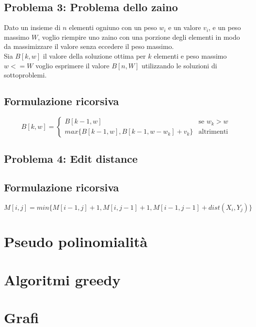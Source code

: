 \documentclass{article}
\begin{document}
\subsection{Problema 3: Problema dello zaino}
Dato un insieme di \(n\) elementi ogniuno con un peso \(w_i\) e un valore \(v_i\), e un peso massimo \(W\), voglio riempire uno zaino con una porzione degli elementi in modo da massimizzare il valore senza eccedere il peso massimo. \\
Sia \(B[k, w]\) il valore della soluzione ottima per \(k\) elementi e peso massimo \(w <= W\) voglio esprimere il valore \(B[n,W]\) utilizzando le soluzioni di sottoproblemi.
\subsection*{Formulazione ricorsiva}
\begin{equation*}
  B[k,w] =
  \begin{cases}
    B[k - 1, w]                         & \text{se } w_k > w \\
    max\{B[k-1,w], B[k-1,w-w_k] + v_k\} & \text{altrimenti}
  \end{cases}
\end{equation*}
\pagebreak

\subsection{Problema 4: Edit distance}
\subsection*{Formulazione ricorsiva}
\begin{equation*}
  M[i,j] = min\{M[i-1, j] + 1, M[i, j-1] + 1, M[i-1, j-1] + dist(X_i,Y_j)\}
\end{equation*}

\section{Pseudo polinomialità}
\pagebreak

\section{Algoritmi greedy}
\pagebreak

\section{Grafi}
\end{document}
